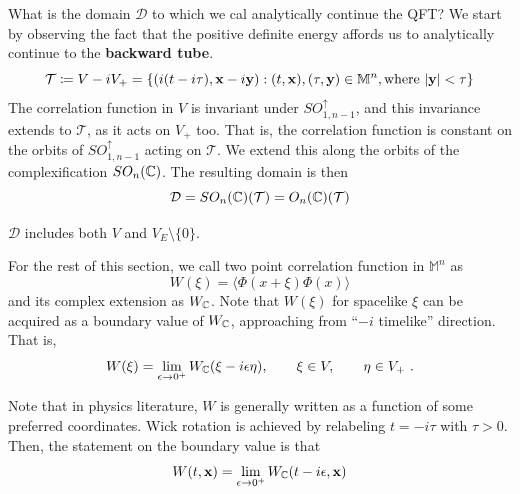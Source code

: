 \documentclass[a4paper,11pt]{article}
\begin{document}
What is the domain $\mathcal D$ to which we cal {analytically continue} the QFT? We start by observing the fact that the positive definite energy affords us to analytically continue to the {\bf backward tube}.
\begin{equation}
    \mathcal{T}\coloneqq V-iV_+=\{(i(t-i\tau),{\bf x}-i{\bf y}):(t,{\bf x}),(\tau, {\bf y})\in {\mathbb M}^n, {\rm where ~} |{\bf y}|<\tau \}
\end{equation}
The correlation function in $V$ is invariant under $SO^{\uparrow}_{1,n-1}$, and this invariance extends to $\mathcal{T}$, as it acts on $V_+$ too. That is, the correlation function is constant on the orbits of $SO^{\uparrow}_{1,n-1}$ acting on $\mathcal{T}$. We extend this along the orbits of the complexification $SO_n(\mathbb{C})$. The resulting domain is then
\begin{equation}
    \mathcal{D}=SO_n(\mathbb{C})(\mathcal{T})=O_n(\mathbb{C})(\mathcal{T})
\end{equation}

\begin{remark}
    $\mathcal{D}$ includes both $V$ and $V_E\setminus\{0\}$.
\end{remark}
For the rest of this section, we call two point correlation function in ${\mathbb M}^n$ as
\begin{equation}
    W(\xi)=\langle \Phi(x+\xi)\Phi(x)\rangle
\end{equation}
and its complex extension as $W_{\mathbb{C}}$. Note that $W(\xi)$ for spacelike $\xi$ can be acquired as a boundary value of $W_{\mathbb{C}}$, approaching from ``$-i$ timelike'' direction. That is,
\begin{equation}
    W(\xi) = \lim_{\epsilon\rightarrow 0^+}W_{\mathbb{C}}(\xi-i\epsilon\eta), \qquad \xi \in V, \qquad \eta \in V_+~.
\end{equation}
\begin{remark}
    Note that in physics literature, $W$ is generally written as a function of some preferred coordinates. Wick rotation is achieved by relabeling $t=-i\tau$ with $\tau>0$. Then, the statement on the boundary value is that 
    \begin{equation}
        W(t,{\bf x})= \lim_{\epsilon\rightarrow 0^+}W_{\mathbb{C}}(t-i\epsilon, {\bf x})
    \end{equation}
\end{remark}
\end{document}
